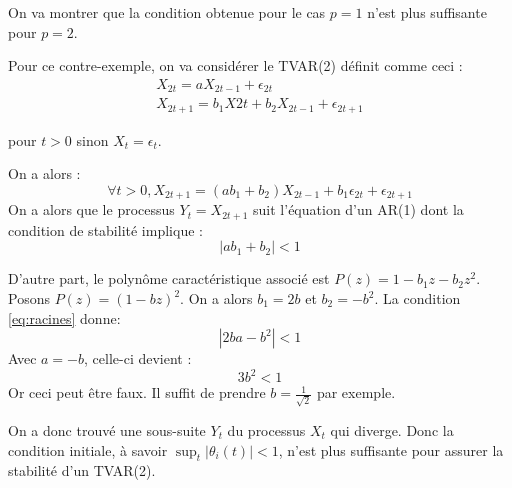 \documentclass{report}
\begin{document}
On va montrer que la condition obtenue pour le cas $p=1$ n'est plus suffisante pour $p=2$.

Pour ce contre-exemple, on va considérer le TVAR(2) définit comme ceci :
\begin{align*}
X_{2t} = a X_{2t-1} + \epsilon_{2t} \\
X_{2t+1} = b_1 X{2t} + b_2 X_{2t-1} + \epsilon_{2t+1}
\end{align*}

pour $t>0$ sinon $X_t = \epsilon_t$.

On a alors :
$$
\forall t>0, X_{2t+1} = (ab_1 + b_2) X_{2t-1} + b_1 \epsilon_{2t} + \epsilon_{2t+1}
$$
On a alors que le processus $Y_t = X_{2t+1}$ suit l'équation d'un AR(1) dont la condition de stabilité implique :
\begin{equation} \label{eq:racines}
|ab_1 + b_2| < 1
\end{equation}

D'autre part, le polynôme caractéristique associé est $P(z) = 1 - b_1 z - b_2 z^2$. Posons $P(z) = (1-bz)^2$. On a alors $b_1 = 2b$ et $b_2 = -b^2$.
La condition \eqref{eq:racines} donne:
$$
|2ba-b^2| <1
$$
Avec $a = -b$, celle-ci devient :
$$
3b^2 < 1
$$
Or ceci peut être faux. Il suffit de prendre $b=\frac{1}{\sqrt{2}}$ par exemple.

On a donc trouvé une sous-suite $Y_t$ du processus $X_t$ qui diverge. Donc la condition initiale, à savoir $\sup_t|\theta_i(t)|<1$, n'est plus suffisante pour assurer la stabilité d'un TVAR(2).
\end{document}
